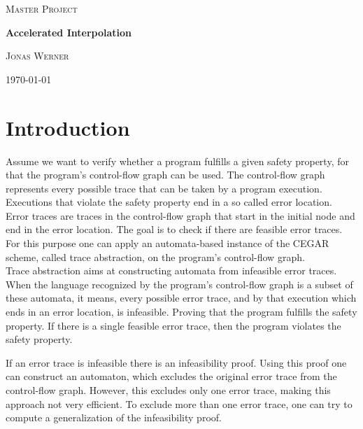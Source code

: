 \documentclass{article}
\begin{document}
	\newcommand{\HorizontalLine}{\rule{\linewidth}{0.3mm}}
	
		\begin{center}
		{\scshape\Large Master Project \par}
		\vspace{1.5cm}
		{\huge\bfseries Accelerated Interpolation \par}
		\vspace{1cm}
		{\large \scshape Jonas Werner\par}
		\vspace{0.5cm}
		{\today \vspace{2cm}} 
		
		\end{center}

\section{Introduction}
Assume we want to verify whether a program fulfills a given safety property, for that the program's control-flow graph can be used. The control-flow graph represents every possible trace that can be taken by a program execution. Executions that violate the safety property end in a so called error location. Error traces are traces in the control-flow graph that start in the initial node and end in the error location. The goal is to check if there are feasible error traces.
For this purpose one can apply an automata-based instance of the CEGAR scheme, called trace abstraction, on the program's control-flow graph. \\

Trace abstraction aims at constructing automata \cite{10.1007/978-3-642-39799-8_2} from infeasible error traces. When the language recognized by the program's control-flow graph is a subset of these automata, it means, every possible error trace, and by that execution which ends in an error location, is infeasible. Proving that the program fulfills the safety property. If there is a single feasible error trace, then the program violates the safety property.\\
\par 
If an error trace is infeasible there is an infeasibility proof. Using this proof one can construct an automaton, which excludes the original error trace from the control-flow graph. However, this excludes only one error trace, making this approach not very efficient. To exclude more than one error trace, one can try to compute a generalization of the infeasibility proof. \par
\end{document}

